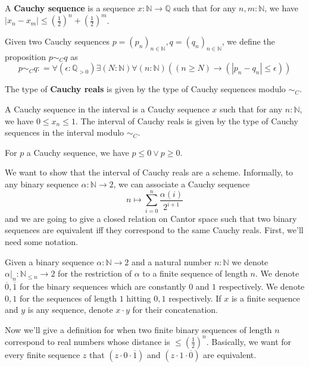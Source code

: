 
\begin{definition}
  A \textbf{Cauchy sequence} is a sequence $x : \mathbb N \to \mathbb Q$ such that
  for any $n,m:\mathbb N$, we have %
$|x_n-x_m| \leq (\frac12)^n + (\frac12)^m$. 
\end{definition}

\begin{definition}
Given two Cauchy sequences $p = (p_n)_{n\in\mathbb N}, q=(q_n)_{n\in\mathbb N}$, 
we define the proposition $p \sim_C  q$ as 
\begin{equation}
  p \sim_C q : = \forall (\epsilon : \mathbb Q_{>0} )\exists ( N :\mathbb N) \forall (n : \mathbb N) ((n \geq N) \to 
  (| p_n - q_n| \leq  \epsilon))
\end{equation}
\end{definition}

\begin{definition}
  The type of \textbf{Cauchy reals} is given by 
  the type of Cauchy sequences modulo $\sim_C$.
\end{definition}

\begin{definition}
  A Cauchy sequence in the interval is a Cauchy sequence $x$ such that 
  for any $n:\mathbb N$, we have $0\leq x_n \leq 1$. 
  The interval of Cauchy reals is given by the type of Cauchy sequences in the interval 
  modulo $\sim_C$. 
\end{definition}  

\begin{lemma}
  For $p$ a Cauchy sequence, we have $p\leq 0 \vee p \geq 0 $. 
\end{lemma}


We want to show that the interval of Cauchy reals are a scheme. 
Informally, to any binary sequence $\alpha : \mathbb N \to 2$, 
we can associate a Cauchy sequence 
\begin{equation}\label{eqnBinaryEncode}
  n\mapsto \sum\limits_{i = 0 }^n \frac {\alpha(i)}{2^{i+1}}
\end{equation}
and we are going to give a closed relation on Cantor space such that 
two binary sequences are equivalent iff they correspond to the same Cauchy reals. 
%
First, we'll need some notation.
\begin{definition}
Given a binary sequence $\alpha:\mathbb N \to 2$ and a natural number $n : \mathbb N$  
we denote $\alpha|_n: \mathbb N_{\leq n} \to 2$ for the 
restriction of $\alpha$ to a finite sequence of length $n$. 
We denote $\overline 0, \overline 1$ for the binary sequences which are constantly $0$ and $1$ respectively. 
We denote $0,1$ for the sequences of length $1$ hitting $0,1$ respectively. 
If $x$ is a finite sequence and $y$ is any sequence, denote $x\cdot y$ for their concatenation. 
\end{definition} 
Now we'll give a definition for when two finite binary sequences of length $n$ correspond 
to real numbers whose distance is $\leq (\frac12)^n$.
Basically, we want for every finite sequence $z$ that 
$(z \cdot 0 \cdot \overline 1)$ and  $(z \cdot 1 \cdot \overline 0)$ are equivalent. 


